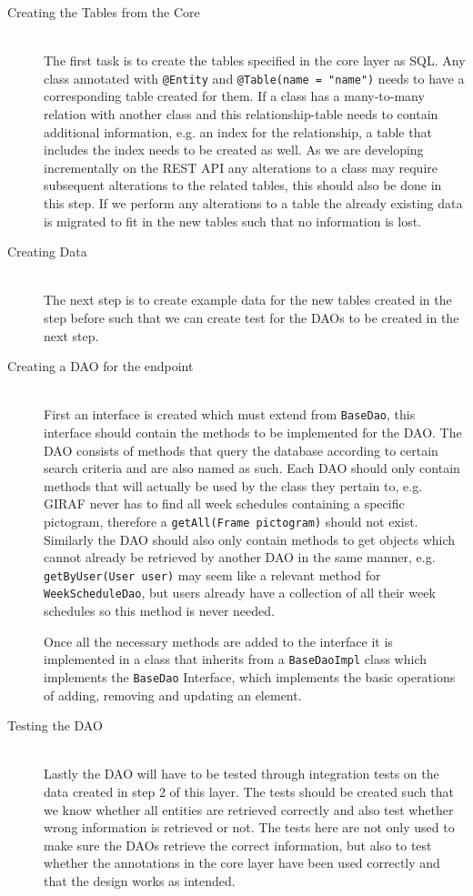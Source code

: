\begin{description}
	\item[Creating the Tables from the Core] \hfill \\
	The first task is to create the tables specified in the core layer as SQL.
	Any class annotated with \texttt{@Entity} and \texttt{@Table(name = "name")} needs to have a corresponding table created for them.
	If a class has a many-to-many relation with another class and this relationship-table needs to contain additional information, e.g. an index for the relationship, a table that includes the index needs to be created as well.
	As we are developing incrementally on the REST API any alterations to a class may require subsequent alterations to the related tables, this should also be done in this step.
	If we perform any alterations to a table the already existing data is migrated to fit in the new tables such that no information is lost.
	\item[Creating Data] \hfill \\
	The next step is to create example data for the new tables created in the step before such that we can create test for the DAOs to be created in the next step.
	\item[Creating a DAO for the endpoint] \hfill \\
	First an interface is created which must extend from \texttt{BaseDao}, this interface should contain the methods to be implemented for the DAO.
	The DAO consists of methods that query the database according to certain search criteria and are also named as such.
	Each DAO should only contain methods that will actually be used by the class they pertain to, e.g. GIRAF never has to find all week schedules containing a specific pictogram, therefore a \texttt{getAll(Frame pictogram)} should not exist.
	Similarly the DAO should also only contain methods to get objects which cannot already be retrieved by another DAO in the same manner,	e.g. \texttt{getByUser(User user)} may seem like a relevant method for \texttt{WeekScheduleDao}, but users already have a collection of all their week schedules so this method is never needed.

	Once all the necessary methods are added to the interface it is implemented in a class that inherits from a \texttt{BaseDaoImpl} class which implements the \texttt{BaseDao} Interface, which implements the basic operations of adding, removing and updating an element.
	\item[Testing the DAO] \hfill \\
	Lastly the DAO will have to be tested through integration tests on the data created in step 2 of this layer.
	The tests should be created such that we know whether all entities are retrieved correctly and also test whether wrong information is retrieved or not.
	The tests here are not only used to make sure the DAOs retrieve the correct information, but also to test whether the annotations in the core layer have been used correctly and that the design works as intended.
\end{description}

